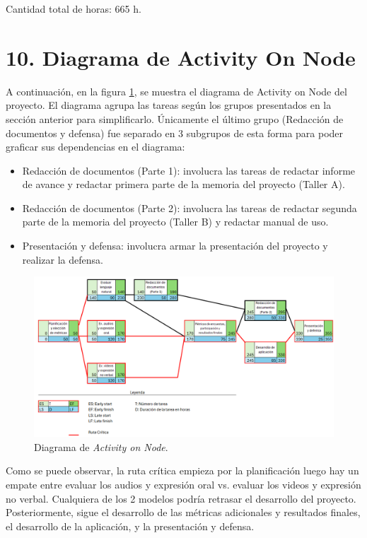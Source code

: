 \documentclass[
11pt, %
codirector, %
]{charter}
\begin{document}
Cantidad total de horas: 665 h.

\section{10. Diagrama de Activity On Node}
\label{sec:AoN}

A continuación, en la figura \ref{fig:AoN}, se muestra el diagrama de Activity on Node del proyecto. El diagrama agrupa las tareas según los grupos presentados en la sección anterior para simplificarlo. Únicamente el último grupo (Redacción de documentos y defensa) fue separado en 3 subgrupos de esta forma para poder graficar sus dependencias en el diagrama:
\begin{itemize}
    \item Redacción de documentos (Parte 1): involucra las tareas de redactar informe de avance y redactar primera parte de la memoria del proyecto (Taller A).
    \item Redacción de documentos (Parte 2): involucra las tareas de redactar segunda parte de la memoria del proyecto (Taller B) y redactar manual de uso.
    \item Presentación y defensa: involucra armar la presentación del proyecto y realizar la defensa.
\end{itemize}


\begin{figure}[htpb]
\centering 
\includegraphics[width=1\textwidth]{./Figuras/Diagrama_AoN.png}
\caption{Diagrama de \textit{Activity on Node}.}
\label{fig:AoN}
\end{figure}

Como se puede observar, la ruta crítica empieza por la planificación luego hay un empate entre evaluar los audios y expresión oral vs. evaluar los videos y expresión no verbal. Cualquiera de los 2 modelos podría retrasar el desarrollo del proyecto. Posteriormente, sigue el desarrollo de las métricas adicionales y resultados finales, el desarrollo de la aplicación, y la presentación y defensa.
\end{document}

